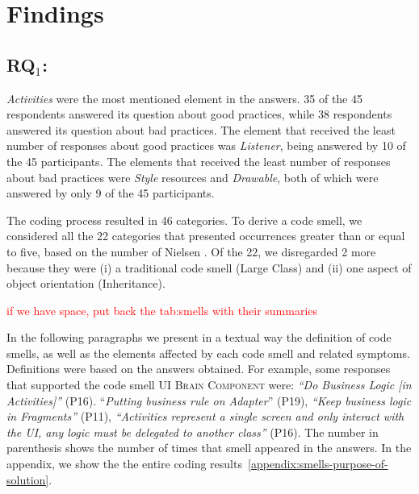\section{Findings}

\subsection{RQ$_1$: \rqone}
\label{phase1-results}

\textit{Activities} were the most mentioned element in the answers. 35 of the 45 respondents answered its question about good practices, while 38 respondents answered its question about bad practices.
The element that received the least number of responses about good practices was \textit{Listener}, being answered by 10 of the 45 participants. The elements that received the least number of responses about bad practices were \textit{Style} resources and \textit{Drawable}, both of which were answered by only 9 of the 45 participants. 

The coding process resulted in 46 categories. To derive a code smell, we considered 
all the 22 categories that presented occurrences greater than or equal to five, based on the number of Nielsen \cite{NielsenMagicNumber:00}.
Of the 22, we disregarded 2 more because they were (i) a traditional code smell (Large Class) and (ii) one aspect of object orientation (Inheritance). 

\textcolor{red}{if we have space, put back the tab:smells with their summaries}

In the following paragraphs we present in a textual way the definition of code smells, as well as the elements affected by each code smell and related symptoms. 
Definitions were based on the answers obtained. For example, some responses that supported the code smell \textsc{\small UI Brain Component} were: \textit{``Do Business Logic [in Activities]''} (P16). ``\textit{Putting business rule on Adapter}'' (P19), \textit{``Keep business logic in Fragments''} (P11), \textit{``Activities represent a single screen and only interact with the UI, any logic must be delegated to another class''} (P16). 
The number in parenthesis shows the number of times that smell appeared in the answers.
In the appendix, we show the the entire coding results~\ref{appendix:smells-purpose-of-solution}.


